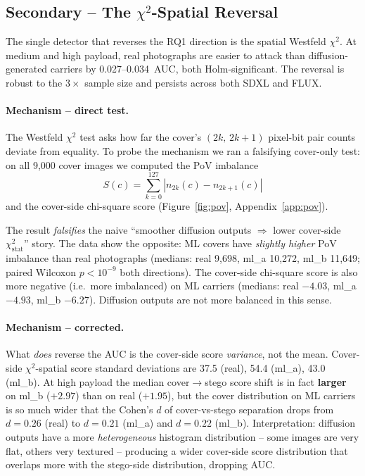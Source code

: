\documentclass[10pt,twocolumn,a4paper]{article}
\begin{document}
\subsection{Secondary -- The $\chi^2$-Spatial Reversal}
\label{sec:chi2spatial}

The single detector that reverses the RQ1 direction is the spatial Westfeld $\chi^2$. At medium and high payload, real photographs are easier to attack than diffusion-generated carriers by 0.027--0.034~AUC, both Holm-significant. The reversal is robust to the $3\!\times\!$ sample size and persists across both SDXL and FLUX.

\paragraph{Mechanism -- direct test.} The Westfeld $\chi^2$ test asks how far the cover's $(2k,\,2k\!+\!1)$ pixel-bit pair counts deviate from equality. To probe the mechanism we ran a falsifying cover-only test: on all 9{,}000 cover images we computed the PoV imbalance
\begin{equation}
S(c) = \sum_{k=0}^{127} |n_{2k}(c) - n_{2k+1}(c)|
\label{eq:pov-imbalance}
\end{equation}
\noindent and the cover-side chi-square score (Figure~\ref{fig:pov}, Appendix~\ref{app:pov}).

The result \emph{falsifies} the naive ``smoother diffusion outputs $\Rightarrow$ lower cover-side $\chi^2_\text{stat}$'' story. The data show the opposite: ML covers have \emph{slightly higher} PoV imbalance than real photographs (medians: real 9{,}698, ml\_a 10{,}272, ml\_b 11{,}649; paired Wilcoxon $p\!<\!10^{-9}$ both directions). The cover-side chi-square score is also more negative (i.e.\ more imbalanced) on ML carriers (medians: real $-4.03$, ml\_a $-4.93$, ml\_b $-6.27$). Diffusion outputs are not more balanced in this sense.

\paragraph{Mechanism -- corrected.} What \emph{does} reverse the AUC is the cover-side score \emph{variance}, not the mean. Cover-side $\chi^2$-spatial score standard deviations are 37.5 (real), 54.4 (ml\_a), 43.0 (ml\_b). At high payload the median cover$\to$stego score shift is in fact \textbf{larger} on ml\_b ($+2.97$) than on real ($+1.95$), but the cover distribution on ML carriers is so much wider that the Cohen's $d$ of cover-vs-stego separation drops from $d\!=\!0.26$ (real) to $d\!=\!0.21$ (ml\_a) and $d\!=\!0.22$ (ml\_b). Interpretation: diffusion outputs have a more \emph{heterogeneous} histogram distribution -- some images are very flat, others very textured -- producing a wider cover-side score distribution that overlaps more with the stego-side distribution, dropping AUC.
\end{document}

